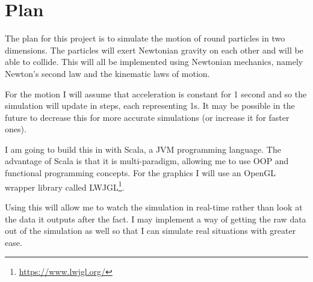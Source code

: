 \section{Plan}
	The plan for this project is to simulate the motion of round particles in two dimensions. The particles will exert Newtonian gravity on each other and will be able to collide. This will all be implemented using Newtonian mechanics, namely Newton's second law and the kinematic laws of motion.
	
	For the motion I will assume that acceleration is constant for 1 second and so the simulation will update in steps, each representing 1s. It may be possible in the future to decrease this for more accurate simulations (or increase it for faster ones).
	
	I am going to build this in with Scala, a JVM programming language. The advantage of Scala is that it is multi-paradigm, allowing me to use OOP and functional programming concepts. For the graphics I will use an OpenGL wrapper library called LWJGL\footnote{\url{https://www.lwjgl.org/}}.
	
	Using this will allow me to watch the simulation in real-time rather than look at the data it outputs after the fact. I may implement a way of getting the raw data out of the simulation as well so that I can simulate real situations with greater ease.